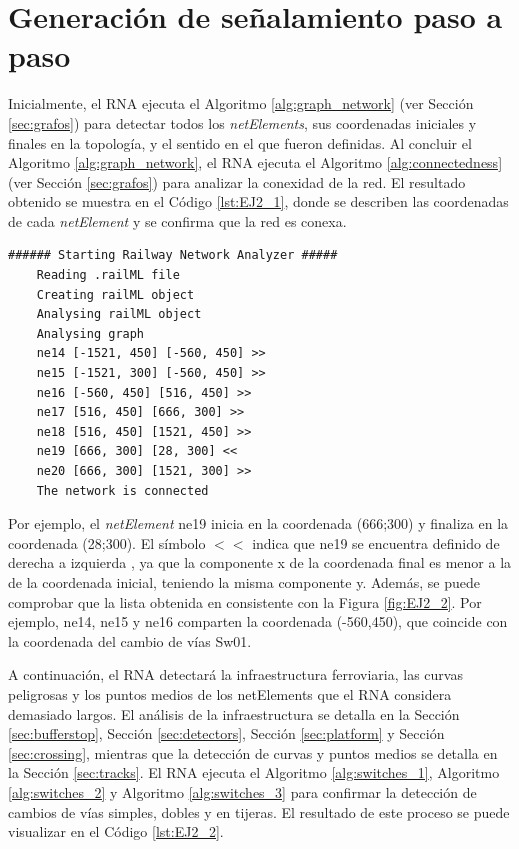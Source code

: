 \section{Generación de señalamiento paso a paso}
	
	Inicialmente, el RNA ejecuta el Algoritmo \ref{alg:graph_network} (ver Sección \ref{sec:grafos}) para detectar todos los \textit{netElements}, sus coordenadas iniciales y finales en la topología, y el sentido en el que fueron definidas. Al concluir el Algoritmo \ref{alg:graph_network}, el RNA ejecuta el Algoritmo \ref{alg:connectedness} (ver Sección \ref{sec:grafos}) para analizar la conexidad de la red. El resultado obtenido se muestra en el Código \ref{lst:EJ2_1}, donde se describen las coordenadas de cada \textit{netElement} y se confirma que la red es conexa.
	
	\begin{lstlisting}[language = {}, caption = Detección de \textit{netElements} por parte del RNA , label = {lst:EJ2_1}]
	###### Starting Railway Network Analyzer #####
	Reading .railML file
	Creating railML object
	Analysing railML object
	Analysing graph
	ne14 [-1521, 450] [-560, 450] >>
	ne15 [-1521, 300] [-560, 450] >>
	ne16 [-560, 450] [516, 450] >>
	ne17 [516, 450] [666, 300] >>
	ne18 [516, 450] [1521, 450] >>
	ne19 [666, 300] [28, 300] <<
	ne20 [666, 300] [1521, 300] >>
	The network is connected
	\end{lstlisting}

	Por ejemplo, el \textit{netElement} ne19 inicia en la coordenada (666;300) y finaliza en la coordenada (28;300). El símbolo $<<$ indica que ne19 se encuentra definido de derecha a izquierda , ya que la componente x de la coordenada final es menor a la de la coordenada inicial, teniendo la misma componente y. Además, se puede comprobar que la lista obtenida en consistente con la Figura \ref{fig:EJ2_2}. Por ejemplo, ne14, ne15 y ne16 comparten la coordenada (-560,450), que coincide con la coordenada del cambio de vías Sw01.
	
	A continuación, el RNA detectará la infraestructura ferroviaria, las curvas peligrosas y los puntos medios de los netElements que el RNA considera demasiado largos. El análisis de la infraestructura se detalla en la Sección \ref{sec:bufferstop}, Sección \ref{sec:detectors}, Sección \ref{sec:platform} y Sección \ref{sec:crossing}, mientras que la detección de curvas y puntos medios se detalla en la Sección \ref{sec:tracks}. El RNA ejecuta el Algoritmo \ref{alg:switches_1}, Algoritmo \ref{alg:switches_2} y Algoritmo \ref{alg:switches_3} para confirmar la detección de cambios de vías simples, dobles y en tijeras. El resultado de este proceso se puede visualizar en el Código \ref{lst:EJ2_2}.
	

